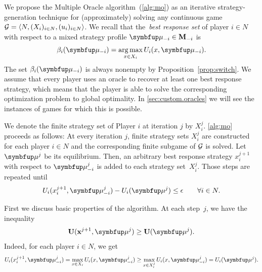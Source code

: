 We propose the Multiple Oracle algorithm~(\ref{alg:mo}) as an iterative strategy-generation technique for (approximately) solving any continuous game~$\mathcal{G}=\langle N,(X_i)_{i\in N},(u_i)_{i\in N}\rangle$. We recall that the~\emph{best response set} of player $i\in N$ with respect to a mixed strategy profile $\bmu_{-i}\in \bM_{-i}$ is
\[
\beta_i(\bmu_{-i}) =  \argmax_{x\in X_i} U_i(x,\bmu_{-i}).
\]
The set $\beta_i(\bmu_{-i})$ is always nonempty by Proposition~\ref{prop:switch}. We assume that every player uses an oracle to recover at least one best response strategy, which means that the player is able to solve the corresponding optimization problem to global optimality. In \cref{sec:custom.oracles} we will see the instances of games for which this is possible.


We denote the finite strategy set of Player $i$ at iteration $j$ by $X_i^j$. \cref{alg:mo} proceeds as follows: At every iteration $j$, finite strategy sets $X_i^j$ are constructed for each player $i\in N$ and the corresponding finite subgame of $\mathcal{G}$ is solved. Let $\bmu^j$ be its equilibrium. Then, an arbitrary best response strategy $x_i^{j+1}$ with respect to $\bmu_{-i}^{j}$ is added to each strategy set~$X_i^j$. Those steps are repeated until
\begin{equation}\label{def:diff}
	U_i(x_i^{j+1},\bmu_{-i}^j)-U_i(\bmu^j)\leq \eps \qquad \forall i\in N.
\end{equation}

First we discuss basic properties of the algorithm.  At each step~$j$, we have the inequality
\begin{equation}\label{ineq:upper}
	\bU(\bx^{j+1},\bmu^j)\ge \bU(\bmu^j).
\end{equation}
Indeed, for each player $i\in N$, we get
\[
	U_i(x_i^{j+1},\bmu_{-i}^j) = \max_{x \in X_i} U_i(x,\bmu^j_{-i}) \ge \max_{x \in X_i^j} U_i(x,\bmu^j_{-i}) = U_i(\bmu^j).
\]

